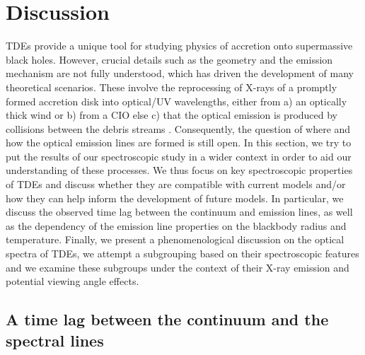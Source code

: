 \documentclass[structabstract]{aa}
\begin{document}
\section{Discussion} \label{sec:discussion}

TDEs provide a unique tool for studying physics of accretion onto supermassive black holes. However, crucial details such as the geometry and the emission mechanism
are not fully understood, which has driven the development of many theoretical scenarios. These involve the reprocessing of X-rays of a promptly formed accretion disk into optical/UV wavelengths, either from a) an optically thick wind \citep{Dai2018} or b) from a CIO \citep{Lu2020} else c) that the optical emission is produced by collisions between the debris streams \citep{Piran2015,Jiang2016}. Consequently, the question of where and how the optical emission lines are formed is still open. In this section, we try to put the results of our spectroscopic study in a wider context in order to aid our understanding of these processes. 
We thus focus on key spectroscopic properties of TDEs and discuss whether they are compatible with current models and/or how they can help inform the development of future models.
In particular, we discuss the observed time lag between the continuum and emission lines, as well as the dependency of the emission line properties on the blackbody radius and temperature. Finally, we present a phenomenological discussion on the optical spectra of TDEs, we attempt a subgrouping based on their spectroscopic features and we examine these subgroups under the context of their X-ray emission and potential viewing angle effects.


\subsection{A time lag between the continuum and the spectral lines} \label{subsec:dtl}
\end{document}
